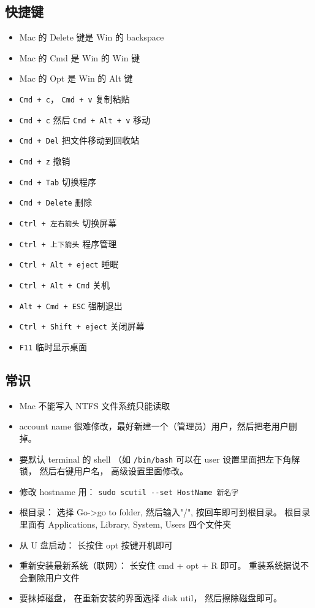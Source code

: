 
\begin{issues}
\issueDraft
\end{issues}

\subsection{快捷键}
\begin{itemize}
\item Mac 的 Delete 键是 Win 的 backspace
\item Mac 的 Cmd 是 Win 的 Win 键
\item Mac 的 Opt 是 Win 的 Alt 键
\item \verb|Cmd + c|， \verb|Cmd + v| 复制粘贴
\item \verb|Cmd + c| 然后 \verb|Cmd + Alt + v| 移动
\item \verb|Cmd + Del| 把文件移动到回收站
\item \verb|Cmd + z| 撤销
\item \verb|Cmd + Tab| 切换程序
\item \verb|Cmd + Delete| 删除
\item \verb|Ctrl + 左右箭头| 切换屏幕
\item \verb|Ctrl + 上下箭头| 程序管理
\item \verb|Ctrl + Alt + eject| 睡眠
\item \verb|Ctrl + Alt + Cmd| 关机
\item \verb|Alt + Cmd + ESC| 强制退出
\item \verb|Ctrl + Shift + eject| 关闭屏幕
\item \verb|F11| 临时显示桌面
\end{itemize}

\subsection{常识}
\begin{itemize}
\item Mac 不能写入 NTFS 文件系统只能读取
\item account name 很难修改，最好新建一个（管理员）用户，然后把老用户删掉。
\item 要默认 terminal 的 shell （如 \verb|/bin/bash| 可以在 user 设置里面把左下角解锁， 然后右键用户名， 高级设置里面修改。
\item 修改 hostname 用： \verb|sudo scutil --set HostName 新名字|
\item 根目录： 选择 Go->go to folder, 然后输入"/", 按回车即可到根目录。 根目录里面有 Applications, Library, System, Users 四个文件夹
\item 从 U 盘启动： 长按住 opt 按键开机即可
\item 重新安装最新系统（联网）： 长安住 cmd + opt + R 即可。 重装系统据说不会删除用户文件
\item 要抹掉磁盘， 在重新安装的界面选择 disk util， 然后擦除磁盘即可。
\end{itemize}

